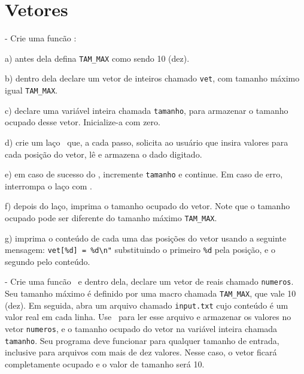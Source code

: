 
\zeraquest

\section{Vetores}


\NEWLINE
\quest - Crie uma funcão \MAIN:

a) antes dela defina \verb|TAM_MAX| como sendo 10 (dez).

b) dentro dela declare um vetor de inteiros chamado {\tt vet}, com tamanho máximo igual \verb|TAM_MAX|.

c) declare uma variável inteira chamada {\tt tamanho}, para armazenar o tamanho ocupado desse vetor. Inicialize-a com zero.

d) crie um laço \FOR\ que, a cada passo, solicita ao usuário que insira valores para cada posição do vetor, lê e armazena o dado digitado.

e) em caso de sucesso do \SCANF, incremente {\tt tamanho} e continue. Em caso de erro, interrompa o laço com \BREAK.

f) depois do laço, imprima o tamanho ocupado do vetor. Note que o tamanho ocupado pode ser diferente do tamanho máximo \verb|TAM_MAX|.

g) imprima o conteúdo de cada uma das posições do vetor usando a seguinte mensagem: \verb|vet[%d] = %d\n"| substituindo o primeiro \verb|%d| pela posição, e o segundo pelo conteúdo.

\NEWLINE
\quest - Crie uma funcão \MAIN\ e dentro dela, declare um vetor de reais chamado {\tt numeros}. Seu tamanho máximo é definido por uma macro chamada \verb|TAM_MAX|, que vale 10 (dez). Em seguida, abra um arquivo chamado {\tt input.txt} cujo conteúdo é um valor real em cada linha. Use \FSCANF\ para ler esse arquivo e armazenar os valores no vetor {\tt numeros}, e o tamanho ocupado do vetor na variável inteira chamada {\tt tamanho}. Seu programa deve funcionar para qualquer tamanho de entrada, inclusive para arquivos com mais de dez valores. Nesse caso, o vetor ficará completamente ocupado e o valor de tamanho será 10.


